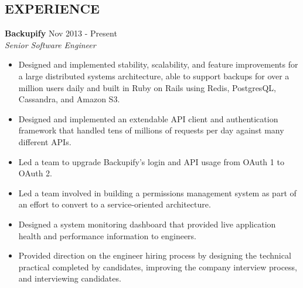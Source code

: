 \documentclass[line,margin]{res}
\begin{document}

      \address{anorwell@gmail.com 857-266-4119 \\
      github.com/ANorwell \\
      Cambridge, MA }
    
 
\begin{resume}

\section{EXPERIENCE}

    {\bf Backupify} \hfill Nov 2013 - Present \\
    {\sl Senior Software Engineer}
                 \begin{itemize}  \itemsep -2pt %
                 \item Designed and implemented stability, scalability, and feature improvements for a large distributed systems architecture, able to support backups for over a million users daily and built in Ruby on Rails using Redis, PostgresQL, Cassandra, and Amazon S3.\item Designed and implemented an extendable API client and authentication framework that handled tens of millions of requests per day against many different APIs.\item Led a team to upgrade Backupify's login and API usage from OAuth 1 to OAuth 2.\item Led a team involved in building a permissions management system as part of an effort to convert to a service-oriented architecture.\item Designed a system monitoring dashboard that provided live application health and performance information to engineers.\item Provided direction on the engineer hiring process by designing the technical practical completed by candidates, improving the company interview process, and interviewing candidates.
                \end{itemize}
  

\end{resume}
\end{document}
